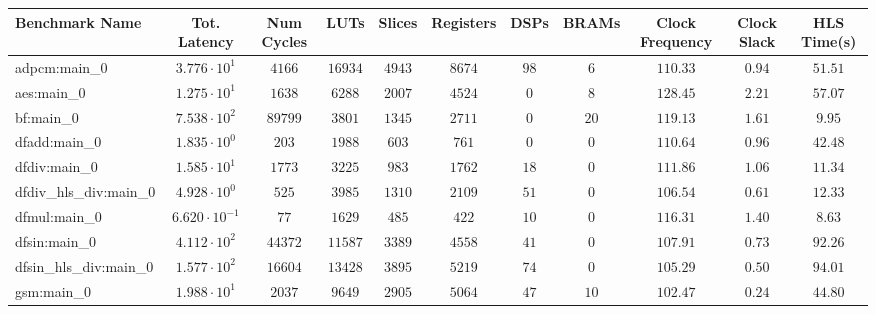 \begin{tabular}{|l|c|c|c|c|c|c|c|c|c|c|}
\hline
Benchmark Name          & Tot. Latency            & Num Cycles & LUTs       & Slices    & Registers & DSPs    & BRAMs   & Clock Frequency & Clock Slack & HLS Time(s) \\
\hline
adpcm:main\_0           & $ 3.776 \cdot 10^{1}  $ & $ 4166   $ & $ 16934  $ & $ 4943  $ & $ 8674  $ & $ 98  $ & $ 6   $ & $ 110.33      $ & $ 0.94    $ & $ 51.51   $ \\
aes:main\_0             & $ 1.275 \cdot 10^{1}  $ & $ 1638   $ & $ 6288   $ & $ 2007  $ & $ 4524  $ & $ 0   $ & $ 8   $ & $ 128.45      $ & $ 2.21    $ & $ 57.07   $ \\
bf:main\_0              & $ 7.538 \cdot 10^{2}  $ & $ 89799  $ & $ 3801   $ & $ 1345  $ & $ 2711  $ & $ 0   $ & $ 20  $ & $ 119.13      $ & $ 1.61    $ & $ 9.95    $ \\
dfadd:main\_0           & $ 1.835 \cdot 10^{0}  $ & $ 203    $ & $ 1988   $ & $ 603   $ & $ 761   $ & $ 0   $ & $ 0   $ & $ 110.64      $ & $ 0.96    $ & $ 42.48   $ \\
dfdiv:main\_0           & $ 1.585 \cdot 10^{1}  $ & $ 1773   $ & $ 3225   $ & $ 983   $ & $ 1762  $ & $ 18  $ & $ 0   $ & $ 111.86      $ & $ 1.06    $ & $ 11.34   $ \\
dfdiv\_hls\_div:main\_0 & $ 4.928 \cdot 10^{0}  $ & $ 525    $ & $ 3985   $ & $ 1310  $ & $ 2109  $ & $ 51  $ & $ 0   $ & $ 106.54      $ & $ 0.61    $ & $ 12.33   $ \\
dfmul:main\_0           & $ 6.620 \cdot 10^{-1} $ & $ 77     $ & $ 1629   $ & $ 485   $ & $ 422   $ & $ 10  $ & $ 0   $ & $ 116.31      $ & $ 1.40    $ & $ 8.63    $ \\
dfsin:main\_0           & $ 4.112 \cdot 10^{2}  $ & $ 44372  $ & $ 11587  $ & $ 3389  $ & $ 4558  $ & $ 41  $ & $ 0   $ & $ 107.91      $ & $ 0.73    $ & $ 92.26   $ \\
dfsin\_hls\_div:main\_0 & $ 1.577 \cdot 10^{2}  $ & $ 16604  $ & $ 13428  $ & $ 3895  $ & $ 5219  $ & $ 74  $ & $ 0   $ & $ 105.29      $ & $ 0.50    $ & $ 94.01   $ \\
gsm:main\_0             & $ 1.988 \cdot 10^{1}  $ & $ 2037   $ & $ 9649   $ & $ 2905  $ & $ 5064  $ & $ 47  $ & $ 10  $ & $ 102.47      $ & $ 0.24    $ & $ 44.80   $ \\

\end{tabular}
